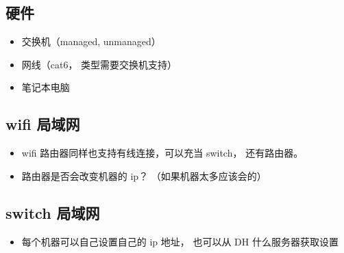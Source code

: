
\begin{issues}
\issueDraft
\end{issues}

\subsection{硬件}
\begin{itemize}
\item 交换机（managed, unmanaged）
\item 网线（cat6， 类型需要交换机支持）
\item 笔记本电脑
\end{itemize}

\subsection{wifi 局域网}
\begin{itemize}
\item wifi 路由器同样也支持有线连接，可以充当 switch， 还有路由器。
\item 路由器是否会改变机器的 ip？ （如果机器太多应该会的）
\end{itemize}


\subsection{switch 局域网}
\begin{itemize}
\item 每个机器可以自己设置自己的 ip 地址， 也可以从 DH 什么服务器获取设置
\end{itemize}
